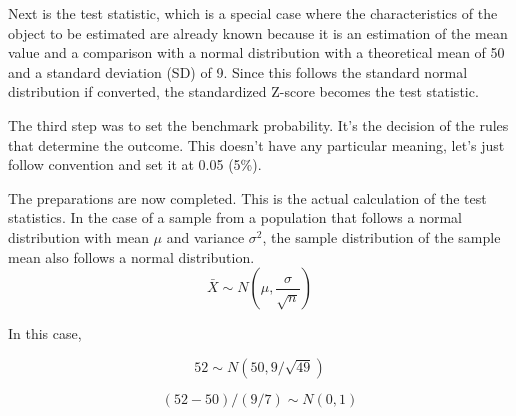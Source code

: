 \documentclass{ltjsbook}
\begin{document}
Next is the test statistic, which is a special case where the characteristics of the object to be estimated are already known because it is an estimation of the mean value and a comparison with a normal distribution with a theoretical mean of 50 and a standard deviation (SD) of 9. Since this follows the standard normal distribution if converted, the standardized Z-score becomes the test statistic.

The third step was to set the benchmark probability. It's the decision of the rules that determine the outcome. This doesn't have any particular meaning, let's just follow convention and set it at 0.05 (5\%).

The preparations are now completed. This is the actual calculation of the test statistics. In the case of a sample from a population that follows a normal distribution with mean $\mu$ and variance $\sigma^2$, the sample distribution of the sample mean also follows a normal distribution.
\[ \bar{X} \sim N(\mu,\frac{\sigma}{\sqrt{n}}) \]

In this case,

\[ 52 \sim N(50,9/\sqrt{49}) \]


\[ (52-50)/(9/7) \sim N(0,1) \]


\end{document}
